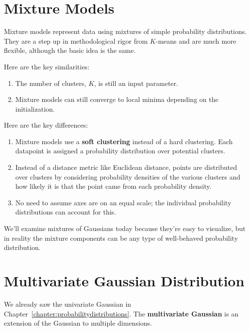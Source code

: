 
\section{Mixture Models \label{sect:mixturemodels}}

Mixture models represent data using mixtures of simple probability distributions. They are a step up in methodological rigor from $K$-means and are much more flexible, although the basic idea is the same. 

\noindent Here are the key similarities:

\begin{enumerate}
\item The number of clusters, $K$, is still an input parameter.
\item Mixture models can still converge to local minima depending on the initialization.
\end{enumerate}

\noindent Here are the key differences:

\begin{enumerate}
\item Mixture models use a \textbf{soft clustering} instead of a hard clustering. Each datapoint is assigned a probability distribution over potential clusters.
\item Instead of a distance metric like Euclidean distance, points are distributed over clusters by considering probability densities of the various clusters and how likely it is that the point came from each probability density.
\item No need to assume axes are on an equal scale; the individual probability distributions can account for this.
\end{enumerate}

We'll examine mixtures of Gaussians today because they're easy to visualize, but in reality the mixture components can be any type of well-behaved probability distribution.


\section{Multivariate Gaussian Distribution}

We already saw the univariate Gaussian in Chapter~\ref{chapter:probabilitydistributions}. The \textbf{multivariate Gaussian} is an extension of the Gaussian to multiple dimensions.

